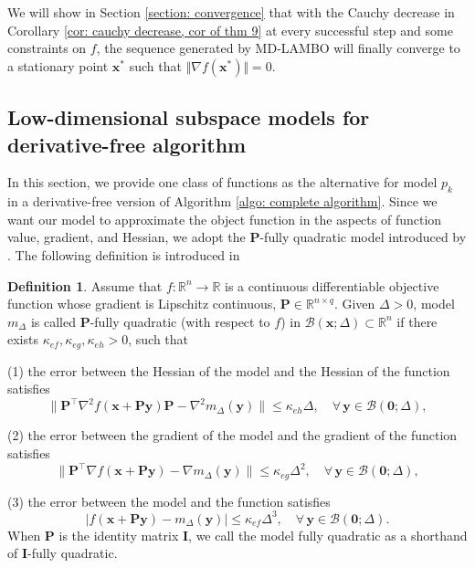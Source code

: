 \documentclass[colorlinks=true, linkcolor=blue, citecolor=blue, urlcolor=blue]{article}
\theoremstyle{plain}
\theoremstyle{definition}
\newtheorem{definition}[theorem]{Definition}
\theoremstyle{remark}
\newcommand{\RR}{\mathbb{R}}
\newcommand{\ul}{\boldsymbol}
\newcommand{\ml}{\boldsymbol}
\begin{document}
We will show in Section \ref{section: convergence} that with the Cauchy decrease in Corollary \ref{cor: cauchy decrease, cor of thm 9} at every successful step and some constraints on $f$, the sequence generated by MD-LAMBO will finally converge to a stationary point $\bm x^*$ such that $\Vert \nabla f(\bm x^*)\Vert=0$. 


\subsection{Low-dimensional subspace models for derivative-free algorithm}\label{section: Model functions for derivative-free algorithm}

In this section, we provide one class of functions as the alternative for model $p_k$ in a derivative-free version of Algorithm \ref{algo: complete algorithm}. Since we want our model to approximate the object function in the aspects of function value, gradient, and {\color{black}Hessian}, we adopt the $\bm P$-fully quadratic model introduced by \citet{Cartis2023}. The following definition is introduced in \cite{1chen2024q}
\begin{definition}\label{P-fully_quadratic}
    Assume that $f: \RR^n \rightarrow \RR$ is a continuous differentiable objective function whose gradient is Lipschitz continuous, $\bm{P} \in \RR^{n \times q}$. Given $\Delta > 0$, model $m_{\Delta}$ is called $\bm P$-fully quadratic (with respect to $f$) in $\mathcal{B}(\bm x;\Delta)\subset\mathbb{R}^n$ if there exists $\kappa_{ef}, \kappa_{eg}, \kappa_{eh} > 0$, such that 

    (1) the error between the Hessian of the model and the Hessian of the function satisfies
    $$
    \|\ml{P}^{\top} \nabla^2 f(\ul{x + P y}) \ml{P} -\nabla^2 m_{\Delta}(\ul{y})\| \leq \kappa_{eh} \Delta, \quad \forall \,   \ul{y} \in \mathcal{B}(\ul{0} ; \Delta),
    $$

    (2) the error between the gradient of the model and the gradient of the function satisfies
    $$
    \|\ml{P}^{\top} \nabla f(\ul{x + P y})-\nabla m_{\Delta}(\ul{y})\| \leq \kappa_{e g} \Delta^2, \quad \forall \,   \ul{y} \in \mathcal{B}(\ul{0} ; \Delta),
    $$

    (3) the error between the model and the function satisfies  
    $$
    |f(\ul{x + Py})-m_{\Delta}(\ul{y})| \leq \kappa_{e f} \Delta^3, \quad \forall \,   \ul{y} \in \mathcal{B}(\ul{0} ; \Delta). 
    $$
When $\bm P$ is the identity matrix $\bm I$, we call the model fully quadratic as a shorthand of $\bm I$-fully quadratic. 
\end{definition}
\end{document}
